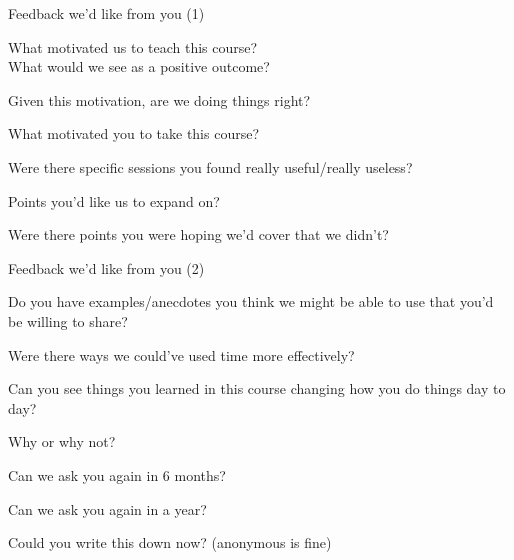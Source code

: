 \documentclass[12pt,t]{beamer}
\begin{document}
\begin{frame}[c]{Feedback we'd like from you (1)}

  {\lolit What motivated us to teach this course? \\
  What would we see as a positive outcome? \\[18pt]}

  \bi
\item Given this motivation, are we doing things right?
\item What motivated you to take this course?
\item Were there specific sessions you found really useful/really
    useless?
  \item Points you'd like us to expand on?
  \item Were there points you were hoping we'd cover that we didn't?
    \ei

  \note{}


\end{frame}



\begin{frame}[c]{Feedback we'd like from you (2)}

  \bi
\item Do you have examples/anecdotes you think we might be able to use
  that you'd be willing to share?
\item Were there ways we could've used time more effectively?
  \item Can you see things you learned in this course changing how you
    do things day to day?
    \bi
  \item Why or why not?
  \item Can we ask you again in 6 months?
  \item Can we ask you again in a year?
    \ei

 \item Could you write this down now? (anonymous is fine)
    \ei

  \note{}


\end{frame}
\end{document}
